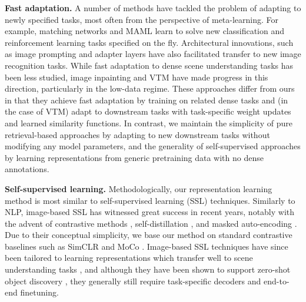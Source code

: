 \documentclass{article}
\begin{document}
\textbf{Fast adaptation. }
A number of methods have tackled the problem of adapting to newly specified tasks, most often from the perspective of meta-learning. For example, matching networks \cite{vinyals2017matching} and MAML \cite{finn2017model} learn to solve new classification and reinforcement learning tasks specified on the fly. Architectural innovations, such as image prompting \cite{jia2022visual,bahng2022exploring,zhang2023VisualPromptRetrieval} and adapter layers \cite{frankle2020training,rebuffi2017learning} have also facilitated transfer to new image recognition tasks. While fast adaptation to dense scene understanding tasks has been less studied, image inpainting \cite{bar2022visual,wang2022images} and VTM \cite{kim2023universal} have made progress in this direction, particularly in the low-data regime. These approaches differ from ours in that they achieve fast adaptation by training on related dense tasks and (in the case of VTM) adapt to downstream tasks with task-specific weight updates and learned similarity functions. In contrast, we maintain the simplicity of pure retrieval-based approaches by adapting to new downstream tasks without modifying any model parameters, and the generality of self-supervised approaches by learning representations from generic pretraining data with no dense annotations. 

\textbf{Self-supervised learning. } Methodologically, our representation learning method is most similar to self-supervised learning (SSL) techniques. Similarly to NLP, image-based SSL has witnessed great success in recent years, notably with the advent of contrastive methods \cite{dosovitskiy2014discriminative,chen2020simple,caron2020unsupervised,henaff2021efficient,caron2021emerging}, self-distillation \cite{caron2018deep,grill2020bootstrap,chen2021exploring}, and masked auto-encoding \cite{he2021masked}. Due to their conceptual simplicity, we base our method on standard contrastive baselines such as SimCLR \cite{chen2020simple} and MoCo \cite{he2019momentum}. 
Image-based SSL techniques have since been tailored to learning representations which transfer well to scene understanding tasks \cite{van2021unsupervised,henaff2021efficient,xie2021detco,caron2022location}, and although they have been shown to support zero-shot object discovery \cite{henaff2022object,simeoni2021localizing}, 
they generally still require task-specific decoders and end-to-end finetuning. 
\end{document}

